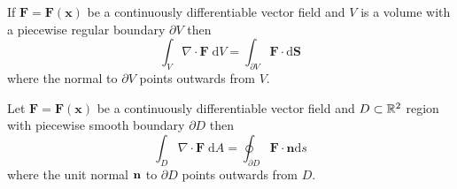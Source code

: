 \documentclass[11pt]{article}
\begin{document}
\begin{theorem}
	If $\mathbf{F}=\mathbf{F}(\mathbf{x})$ be a continuously differentiable vector field and $V$ is a volume with a piecewise regular boundary $\partial V$ then
$$
\int_{V} \nabla \cdot \mathbf{F}\; \mathrm{d} V=\int_{\partial V} \mathbf{F} \cdot \mathrm{d} \mathbf{S}
$$
where the normal to $\partial V$ points outwards from $V$.
\end{theorem}

\begin{theorem}
	Let $\mathbf{F}=\mathbf{F}(\mathbf{x})$ be a continuously differentiable vector field and $D \subset \mathbb{R}^{2}$ region with piecewise smooth boundary $\partial D$ then
	$$
	\int_{D} \nabla \cdot \mathbf{F} \;\mathrm{d} A=\oint_{\partial D} \mathbf{F} \cdot \mathbf{n} \mathrm{d} s
	$$
	where the unit normal $\mathbf{n}$ to $\partial D$ points outwards from $D .$
\end{theorem}
\end{document}
